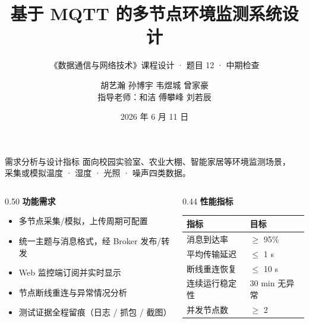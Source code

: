 \documentclass[aspectratio=169,10pt]{ctexbeamer}
\title{基于 MQTT 的多节点环境监测系统设计}
\subtitle{《数据通信与网络技术》课程设计 · 题目 12 · 中期检查}
\author{胡艺瀚 \quad 孙博宇 \quad 韦煜城 \quad 曾家豪\\[4pt]
  {\small 指导老师：和洁 \quad 傅攀峰 \quad 刘若辰}}
\date{2026 年 6 月 11 日}
\begin{document}
\maketitle

\begin{frame}{需求分析与设计指标}
  \vspace{2pt}
  面向校园实验室、农业大棚、智能家居等环境监测场景，\\
  采集或模拟温度 · 湿度 · 光照 · 噪声四类数据。
  \vspace{10pt}
  \begin{columns}[T]
    \begin{column}{0.50\textwidth}
      \textbf{功能需求}
      {\footnotesize
      \begin{itemize}\itemsep=3pt
        \item 多节点采集/模拟，上传周期可配置
        \item 统一主题与消息格式，经 Broker 发布/转发
        \item Web 监控端订阅并实时显示
        \item 节点断线重连与异常情况分析
        \item 测试证据全程留痕（日志 / 抓包 / 截图）
      \end{itemize}}
    \end{column}
    \begin{column}{0.44\textwidth}
      \textbf{性能指标}\\[4pt]
      {\small
      \begin{tabular}{ll}
        \toprule
        指标 & 目标 \\
        \midrule
        消息到达率 & $\geq$ 95\% \\
        平均传输延迟 & $\leq$ 1 s \\
        断线重连恢复 & $\leq$ 10 s \\
        连续运行稳定性 & 30 min 无异常 \\
        并发节点数 & $\geq$ 2 \\
        \bottomrule
      \end{tabular}}
    \end{column}
  \end{columns}
\end{frame}
\end{document}
